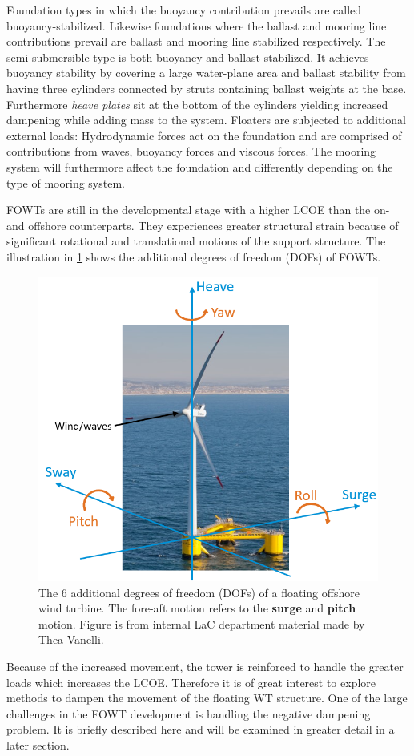 Foundation types in which the buoyancy contribution prevails are called buoyancy-stabilized. Likewise foundations where the ballast and mooring line contributions prevail are ballast and mooring line stabilized respectively. The semi-submersible type is both buoyancy and ballast stabilized. It achieves buoyancy stability by covering a large water-plane area and ballast stability from having three cylinders connected by struts containing ballast weights at the base. Furthermore \textit{heave plates} sit at the bottom of the cylinders yielding increased dampening while adding mass to the system.
Floaters are subjected to additional external loads: Hydrodynamic forces act on the foundation and are comprised of contributions from waves, buoyancy forces and viscous forces. The mooring system will furthermore affect the foundation and differently depending on the type of mooring system.

\smallskip
FOWTs are still in the developmental stage with a higher LCOE than the on- and offshore counterparts. They experiences greater structural strain because of significant rotational and translational motions of the support structure. The illustration in \cref{fig:fowt_coordinates} shows the additional degrees of freedom (DOFs) of FOWTs.
\begin{figure}[ht]
	\centering
	\includegraphics[width=0.55\linewidth]{Graphics/FOWTcoordinates.png}
	\caption{The 6 additional degrees of freedom (DOFs) of a floating offshore wind turbine. The fore-aft motion refers to the \textbf{surge} and \textbf{pitch} motion. Figure is from internal LaC department material made by Thea Vanelli.}
	\label{fig:fowt_coordinates}
\end{figure}
Because of the increased movement, the tower is reinforced to handle the greater loads which increases the LCOE. Therefore it is of great interest to explore methods to dampen the movement of the floating WT structure. One of the large challenges in the FOWT development is handling the negative dampening problem. It is briefly described here and will be examined in greater detail in a later section.

